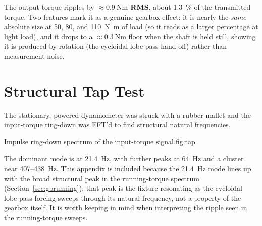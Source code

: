 \documentclass[11pt]{article}
\begin{document}
The output torque ripples by \textbf{$\approx\SI{0.9}{\newton\meter}$ RMS}, about
\SI{1.3}{\percent} of the transmitted torque. Two features mark it as a genuine
gearbox effect: it is nearly the \emph{same} absolute size at 50, 80, and
\SI{110}{\newton\meter} of load (so it reads as a larger percentage at light load),
and it drops to a $\approx\SI{0.3}{\newton\meter}$ floor when the shaft is held
still, showing it is produced by rotation (the cycloidal lobe-pass hand-off)
rather than measurement noise.

\appendix
\section{Structural Tap Test}\label{sec:tap}
The stationary, powered dynamometer was struck with a rubber mallet and the
input-torque ring-down was FFT'd to find structural natural frequencies.

  {Impulse ring-down spectrum of the input-torque signal.}{fig:tap}

The dominant mode is at \SI{21.4}{\hertz}, with further peaks at \SI{64}{\hertz}
and a cluster near \SI{407}{}--\SI{438}{\hertz}. This appendix is included because
the \SI{21.4}{\hertz} mode lines up with the broad structural peak in the
running-torque spectrum (Section~\ref{sec:gbrunning}): that peak is the fixture
resonating as the cycloidal lobe-pass forcing sweeps through its natural frequency,
not a property of the gearbox itself. It is worth keeping in mind when interpreting
the ripple seen in the running-torque sweeps.
\end{document}
